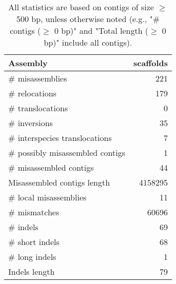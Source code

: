 \documentclass[12pt,a4paper]{article}
\begin{document}
\begin{table}[ht]
\begin{center}
\caption{All statistics are based on contigs of size $\geq$ 500 bp, unless otherwise noted (e.g., "\# contigs ($\geq$ 0 bp)" and "Total length ($\geq$ 0 bp)" include all contigs).}
\begin{tabular}{|l*{1}{|r}|}
\hline
Assembly & scaffolds \\ \hline
\# misassemblies & 221 \\ \hline
\hspace{5mm}\# relocations & 179 \\ \hline
\hspace{5mm}\# translocations & 0 \\ \hline
\hspace{5mm}\# inversions & 35 \\ \hline
\hspace{5mm}\# interspecies translocations & 7 \\ \hline
\# possibly misassembled contigs & 1 \\ \hline
\# misassembled contigs & 44 \\ \hline
Misassembled contigs length & 4158295 \\ \hline
\# local misassemblies & 11 \\ \hline
\# mismatches & 60696 \\ \hline
\# indels & 69 \\ \hline
\hspace{5mm}\# short indels & 68 \\ \hline
\hspace{5mm}\# long indels & 1 \\ \hline
Indels length & 79 \\ \hline
\end{tabular}
\end{center}
\end{table}
\end{document}
